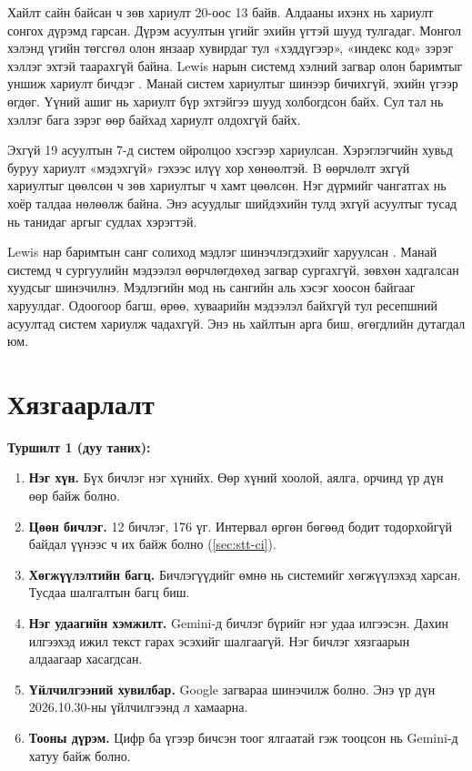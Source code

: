 Хайлт сайн байсан ч зөв хариулт 20-оос 13 байв. Алдааны ихэнх нь хариулт сонгох дүрэмд гарсан. Дүрэм асуултын үгийг эхийн үгтэй шууд тулгадаг. Монгол хэлэнд үгийн төгсгөл олон янзаар хувирдаг тул «хэддүгээр», «индекс код» зэрэг хэллэг эхтэй таарахгүй байна. Lewis нарын системд хэлний загвар олон баримтыг уншиж хариулт бичдэг \cite{lewis2020rag}. Манай систем хариултыг шинээр бичихгүй, эхийн үгээр өгдөг. Үүний ашиг нь хариулт бүр эхтэйгээ шууд холбогдсон байх. Сул тал нь хэллэг бага зэрэг өөр байхад хариулт олдохгүй байх.

Эхгүй 19 асуултын 7-д систем ойролцоо хэсгээр хариулсан. Хэрэглэгчийн хувьд буруу хариулт «мэдэхгүй» гэхээс илүү хор хөнөөлтэй. B өөрчлөлт эхгүй хариултыг цөөлсөн ч зөв хариултыг ч хамт цөөлсөн. Нэг дүрмийг чангатгах нь хоёр талдаа нөлөөлж байна. Энэ асуудлыг шийдэхийн тулд эхгүй асуултыг тусад нь танидаг аргыг судлах хэрэгтэй.

Lewis нар баримтын санг солиход мэдлэг шинэчлэгдэхийг харуулсан \cite{lewis2020rag}. Манай системд ч сургуулийн мэдээлэл өөрчлөгдөхөд загвар сургахгүй, зөвхөн хадгалсан хуудсыг шинэчилнэ. Мэдлэгийн мод нь сангийн аль хэсэг хоосон байгааг харуулдаг. Одоогоор багш, өрөө, хуваарийн мэдээлэл байхгүй тул ресепшний асуултад систем хариулж чадахгүй. Энэ нь хайлтын арга биш, өгөгдлийн дутагдал юм.

\section{Хязгаарлалт}
\label{sec:limits}

\textbf{Туршилт 1 (дуу таних):}
\begin{enumerate}
    \item \textbf{Нэг хүн.} Бүх бичлэг нэг хүнийх. Өөр хүний хоолой, аялга, орчинд үр дүн өөр байж болно.
    \item \textbf{Цөөн бичлэг.} 12 бичлэг, 176 үг. Интервал өргөн бөгөөд бодит тодорхойгүй байдал үүнээс ч их байж болно (\ref{sec:stt-ci}).
    \item \textbf{Хөгжүүлэлтийн багц.} Бичлэгүүдийг өмнө нь системийг хөгжүүлэхэд харсан. Тусдаа шалгалтын багц биш.
    \item \textbf{Нэг удаагийн хэмжилт.} Gemini-д бичлэг бүрийг нэг удаа илгээсэн. Дахин илгээхэд ижил текст гарах эсэхийг шалгаагүй. Нэг бичлэг хязгаарын алдаагаар хасагдсан.
    \item \textbf{Үйлчилгээний хувилбар.} Google загвараа шинэчилж болно. Энэ үр дүн 2026.10.30-ны үйлчилгээнд л хамаарна.
    \item \textbf{Тооны дүрэм.} Цифр ба үгээр бичсэн тоог ялгаатай гэж тооцсон нь Gemini-д хатуу байж болно.
\end{enumerate}

